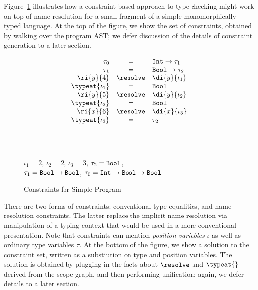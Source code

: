 Figure~\ref{fig:simple-constraints} illustrates how a constraint-based approach
to type checking might work on top of name resolution for a small fragment of a
simple monomorphically-typed language. At the top of the figure, we show the set
of constraints, obtained by walking over the program AST; we defer discussion of
the details of constraint generation to a later section.
\begin{figure}[tb]
\begin{boxedminipage}{\hsize}
\[
\begin{array}{rcl}
\tau_0 & = & \mbox{\tt Int} \rightarrow \tau_1  \\
\tau_1 & = & \mbox{\tt Bool} \rightarrow \tau_2  \\
\ri{y}{4} & \resolve & \di{y}{\iota_1} \\
\typeat{\iota_1} & = & \mbox{\tt Bool}\\
\ri{y}{5} & \resolve & \di{y}{\iota_2} \\
\typeat{\iota_2} & = & \mbox{\tt Bool} \\
\ri{x}{6} & \resolve & \di{x}{\iota_3} \\
\typeat{\iota_3} & = & \tau_2\\
\end{array}
\]
\end{boxedminipage}
\\
\begin{boxedminipage}{\hsize}
\\
$\iota_1 = 2$, $\iota_2 = 2$, $\iota_3 = 3$,
$\tau_2 = \mbox{\tt Bool}$,\\
$\tau_1 = \mbox{\tt Bool} \rightarrow \mbox{\tt Bool}$,
$\tau_0 = \mbox{\tt Int} \rightarrow \mbox{\tt Bool} \rightarrow \mbox{\tt Bool}$
\end{boxedminipage}
\caption{Constraints for Simple Program}
\label{fig:simple-constraints}
\end{figure}
There are two forms of constraints: conventional type equalities,
and name resolution constraints.  The latter replace the implicit
name resolution via manipulation of a typing context that would 
be used in a more conventional presentation.
Note that constraints can
mention {\em position variables} $\iota$ as well as ordinary type variables
$\tau$.  At the bottom of the figure, we show a solution to the constraint set, 
written as a substiution on type and position variables. The solution is
obtained  by plugging in the facts about $\resolve$ and $\typeat{}$ derived 
from the scope graph, and then performing unification; again, we defer details
to a later section.



